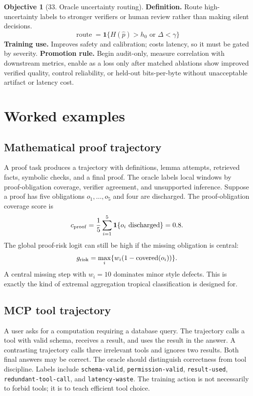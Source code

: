 \documentclass[11pt]{article}
\theoremstyle{definition}
\newtheorem{objective}[theorem]{Objective}
\theoremstyle{remark}
\numberwithin{equation}{section}
\begin{document}
\begin{objective}[33. Oracle uncertainty routing]
\textbf{Definition.} Route high-uncertainty labels to stronger verifiers or human review rather than making silent decisions.
\begin{equation}
    \operatorname{route}=\mathbf 1\{H(\hat p)>h_0\text{ or }\Delta<\gamma\}
\end{equation}
\textbf{Training use.} Improves safety and calibration; costs latency, so it must be gated by severity.
\textbf{Promotion rule.} Begin audit-only, measure correlation with downstream metrics, enable as a loss only after matched ablations show improved verified quality, control reliability, or held-out bits-per-byte without unacceptable artifact or latency cost.
\end{objective}

\section{Worked examples}

\subsection{Mathematical proof trajectory}
A proof task produces a trajectory with definitions, lemma attempts, retrieved facts, symbolic checks, and a final proof.  The oracle labels local windows by proof-obligation coverage, verifier agreement, and unsupported inference.  Suppose a proof has five obligations \(o_1,\ldots,o_5\) and four are discharged.  The proof-obligation coverage score is
\begin{equation}
    c_{\rm proof}=\frac{1}{5}\sum_{i=1}^5 \mathbf 1\{o_i\text{ discharged}\}=0.8.
\end{equation}
The global proof-risk logit can still be high if the missing obligation is central:
\begin{equation}
    g_{\rm risk}=\max_i\{w_i(1-\operatorname{covered}(o_i))\}.
\end{equation}
A central missing step with \(w_i=10\) dominates minor style defects.  This is exactly the kind of extremal aggregation tropical classification is designed for.

\subsection{MCP tool trajectory}
A user asks for a computation requiring a database query.  The trajectory calls a tool with valid schema, receives a result, and uses the result in the answer.  A contrasting trajectory calls three irrelevant tools and ignores two results.  Both final answers may be correct.  The oracle should distinguish correctness from tool discipline.  Labels include \texttt{schema-valid}, \texttt{permission-valid}, \texttt{result-used}, \texttt{redundant-tool-call}, and \texttt{latency-waste}.  The training action is not necessarily to forbid tools; it is to teach efficient tool choice.
\end{document}
